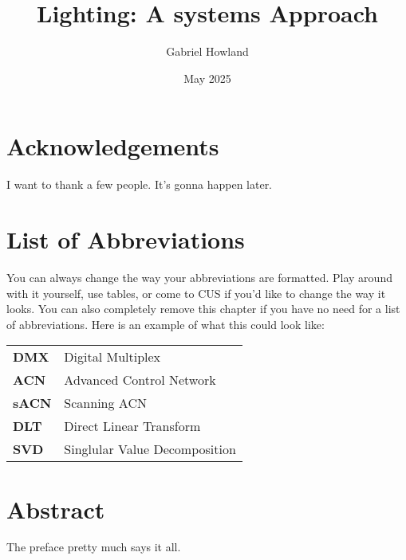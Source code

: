 \documentclass[12pt,twoside]{reedthesis}
\title{Lighting: A systems Approach}
\author{Gabriel Howland}
\date{May 2025}
\begin{document}
  \maketitle
  \frontmatter %
  \pagestyle{empty} %

    \chapter*{Acknowledgements}
	I want to thank a few people. It's gonna happen later.

	

    \chapter*{List of Abbreviations}
		You can always change the way your abbreviations are formatted. Play around with it yourself, use tables, or come to CUS if you'd like to change the way it looks. You can also completely remove this chapter if you have no need for a list of abbreviations. Here is an example of what this could look like:

	\begin{table}[h]
	\centering %
	\begin{tabular}{ll}
		\textbf{DMX}  	&  Digital Multiplex \\
		\textbf{ACN}		&  Advanced Control Network\\
		\textbf{sACN}  	&  Scanning ACN\\
		\textbf{DLT} 	&  Direct Linear Transform\\
		\textbf{SVD}		&  Singlular Value Decomposition\\
	\end{tabular}
	\end{table}
	

    \tableofcontents
    \listoffigures

    \chapter*{Abstract}
	The preface pretty much says it all.
	
\end{document}
